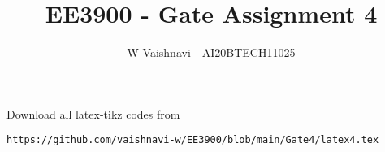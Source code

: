\documentclass[journal,12pt,twocolumn]{IEEEtran}
\DeclareMathOperator*{\Res}{Res}
\begin{document}
\newcommand{\BEQA}{\begin{eqnarray}}
\newcommand{\EEQA}{\end{eqnarray}}
\newcommand{\define}{\stackrel{\triangle}{=}}

\raggedbottom
\setlength{\parindent}{0pt}
\providecommand{\mbf}{\mathbf}
\providecommand{\pr}[1]{\ensuremath{\Pr\left(#1\right)}}
\providecommand{\qfunc}[1]{\ensuremath{Q\left(#1\right)}}
\providecommand{\sbrak}[1]{\ensuremath{{}\left[#1\right]}}
\providecommand{\lsbrak}[1]{\ensuremath{{}\left[#1\right.}}
\providecommand{\rsbrak}[1]{\ensuremath{{}\left.#1\right]}}
\providecommand{\brak}[1]{\ensuremath{\left(#1\right)}}
\providecommand{\lbrak}[1]{\ensuremath{\left(#1\right.}}
\providecommand{\rbrak}[1]{\ensuremath{\left.#1\right)}}
\providecommand{\cbrak}[1]{\ensuremath{\left\{#1\right\}}}
\providecommand{\lcbrak}[1]{\ensuremath{\left\{#1\right.}}
\providecommand{\rcbrak}[1]{\ensuremath{\left.#1\right\}}}
\theoremstyle{remark}
\newtheorem{rem}{Remark}
\newtheorem*{remark}{Remark}
\newcommand{\sgn}{\mathop{\mathrm{sgn}}}
\providecommand{\abs}[1]{\vert#1\vert}
\providecommand{\res}[1]{\Res\displaylimits_{#1}} 
\providecommand{\norm}[1]{\lVert#1\rVert}
\providecommand{\mtx}[1]{\mathbf{#1}}
\providecommand{\mean}[1]{E[ #1 ]}
\providecommand{\fourier}{\overset{\mathcal{F}}{ \rightleftharpoons}}
\providecommand{\system}{\overset{\mathcal{H}}{ \longleftrightarrow}}
\newcommand{\solution}{\noindent \textbf{Solution: }}
\newcommand{\cosec}{\,\text{cosec}\,}
\providecommand{\dec}[2]{\ensuremath{\overset{#1}{\underset{#2}{\gtrless}}}}
\newcommand{\myvec}[1]{\ensuremath{\begin{pmatrix}#1\end{pmatrix}}}
\newcommand{\mydet}[1]{\ensuremath{\begin{vmatrix}#1\end{vmatrix}}}
\makeatletter
{}
\makeatother
\let\StandardTheFigure\thefigure
\let\vec\mathbf
\renewcommand{\thefigure}{\theproblem}
\def\putbox#1#2#3{\makebox[0in][l]{\makebox[#1][l]{}\raisebox{\baselineskip}[0in][0in]{\raisebox{#2}[0in][0in]{#3}}}}
     \def\rightbox#1{\makebox[0in][r]{#1}}
     \def\centbox#1{\makebox[0in]{#1}}
     \def\topbox#1{\raisebox{-\baselineskip}[0in][0in]{#1}}
     \def\midbox#1{\raisebox{-0.5\baselineskip}[0in][0in]{#1}}
\vspace{3cm}
\title{EE3900 - Gate Assignment 4}
\author{W Vaishnavi - AI20BTECH11025}
\maketitle
\newpage
\bigskip
\renewcommand{\thefigure}{\theenumi}
\renewcommand{\thetable}{\theenumi}
Download all latex-tikz codes from 
%
\begin{lstlisting}
https://github.com/vaishnavi-w/EE3900/blob/main/Gate4/latex4.tex
\end{lstlisting}
\end{document}
